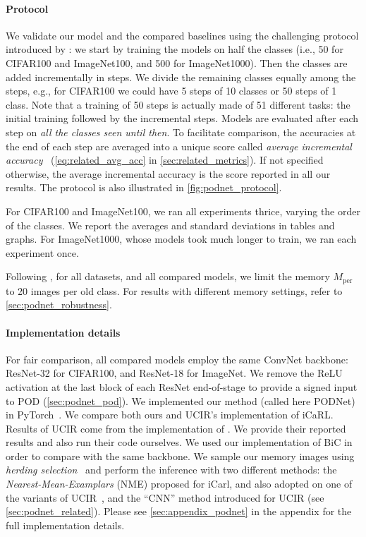 \paragraph{Protocol} We validate our model and the compared baselines using the challenging protocol
introduced by \cite{hou2019ucir}: we start by training the models on half the classes (i.e., 50 for
CIFAR100 and ImageNet100, and 500 for ImageNet1000). Then the classes are added incrementally in
steps. We divide the remaining classes equally among the steps, e.g., for CIFAR100 we could have 5
steps of 10 classes or 50 steps of 1 class. Note that a training of 50 steps is actually made of 51
different tasks: the initial training followed by the incremental steps. Models are evaluated after
each step on \textit{all the classes seen until then}. To facilitate comparison, the accuracies at
the end of each step are averaged into a unique score called \textit{average incremental
    accuracy}~\citep{rebuffi2017icarl} (\autoref{eq:related_avg_acc} in \autoref{sec:related_metrics}).
If not specified otherwise, the average incremental accuracy is the score reported in all our
results. The protocol is also illustrated in \autoref{fig:podnet_protocol}.

For CIFAR100 and ImageNet100, we ran all experiments thrice, varying the order of the classes. We
report the averages and standard deviations in tables and graphs. For ImageNet1000, whose models
took much longer to train, we ran each experiment once.

Following \cite{hou2019ucir}, for all datasets, and all compared models, we limit the memory
$M_\textrm{per}$ to 20 images per old class. For results with different memory settings, refer to
\autoref{sec:podnet_robustness}.

\paragraph{Implementation details} For fair comparison, all compared models employ the same
\ac{ConvNet} backbone: ResNet-32 for CIFAR100, and ResNet-18 for ImageNet. We remove the ReLU
activation at the last block of each ResNet end-of-stage to provide a signed input to POD
(\autoref{sec:podnet_pod}). We implemented our method (called here \ac{PODNet}) in
PyTorch~\citep{paszke2017pytorch}.
%
We compare both ours and UCIR's implementation of iCaRL. Results of UCIR come from the
implementation of \cite{hou2019ucir}. We provide their reported results and also run their code
ourselves. We used our implementation of BiC \citep{wu2019bias_correction} in order to compare with
the same backbone.
%
We sample our memory images using \textit{herding selection}~\citep{rebuffi2017icarl} and perform
the inference with two different methods: the \textit{Nearest-Mean-Examplars} (\ac{NME}) proposed
for iCarl, and also adopted on one of the variants of UCIR~\citep{hou2019ucir}, and the ``CNN''
method introduced for UCIR (see \autoref{sec:podnet_related}).
%
Please see \autoref{sec:appendix_podnet} in the appendix for the full implementation details.

